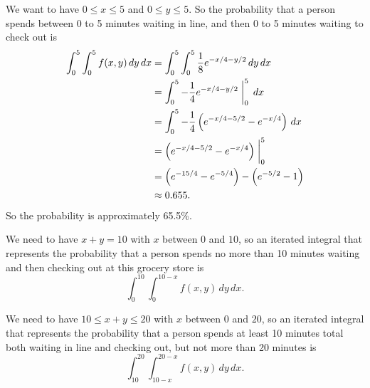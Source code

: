 \begin{exercises}
\begin{exerciseSolution}
	\ba
	\item We want to have $0 \leq x \leq 5$ and $0 \leq y \leq 5$. So the probability that a person spends between 0 to 5 minutes waiting in line, and then 0 to 5 minutes waiting to check out is
	\begin{align*}
	\int_0^{5} \int_0^{5} f(x,y) \, dy \, dx &= \int_0^{5} \int_0^{5} \frac{1}{8} e^{-x/4-y/2} \, dy \, dx \\
		&= \int_0^{5} -\frac{1}{4} e^{-x/4-y/2}\biggm|_0^{5}  \, dx \\
		&= \int_0^{5} -\frac{1}{4} \left(e^{-x/4-5/2} - e^{-x/4}\right)  \, dx \\
		&= \left(e^{-x/4-5/2} - e^{-x/4}\right)\biggm|_{0}^{5} \\
		&= \left(e^{-15/4} - e^{-5/4}\right) - \left(e^{-5/2} - 1\right) \\
		&\approx 0.655.
	\end{align*}
So the probability is approximately 65.5\%. 

	\item We need to have $x+y = 10$ with $x$ between 0 and $10$, so an iterated integral that represents the probability that a person spends no more than 10 minutes waiting and then checking out at this grocery store is
\[\int_0^{10} \int_0^{10-x} f(x,y) \, dy \, dx.\]

	\item We need to have $10 \leq x+y \leq 20$ with $x$ between 0 and $20$, so an iterated integral that represents the probability that a person spends at least 10 minutes total both waiting in line and checking out, but not more than 20 minutes is 
\[\int_{10}^{20} \int_{10-x}^{20-x} f(x,y) \, dy \, dx.\]

	\ea
\end{exerciseSolution}

\end{exercises}

\afterexercises
